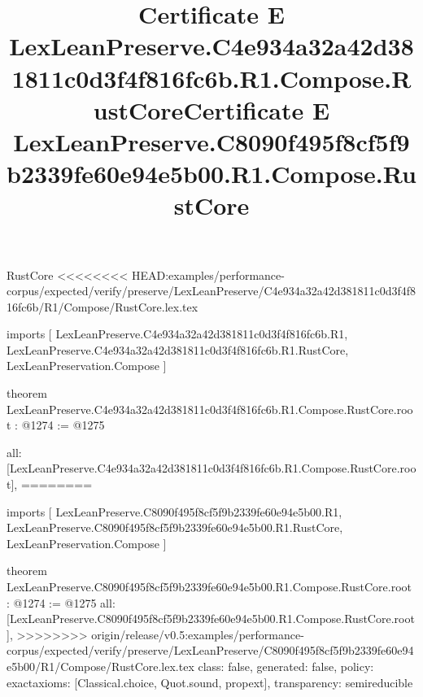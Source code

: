 \begin{lexlean}{RustCore}
<<<<<<<< HEAD:examples/performance-corpus/expected/verify/preserve/LexLeanPreserve/C4e934a32a42d381811c0d3f4f816fc6b/R1/Compose/RustCore.lex.tex
\title{Certificate E LexLeanPreserve.C4e934a32a42d381811c0d3f4f816fc6b.R1.Compose.RustCore}
\begin{coremodule}
imports [
  LexLeanPreserve.C4e934a32a42d381811c0d3f4f816fc6b.R1,
  LexLeanPreserve.C4e934a32a42d381811c0d3f4f816fc6b.R1.RustCore,
  LexLeanPreservation.Compose
]

theorem LexLeanPreserve.C4e934a32a42d381811c0d3f4f816fc6b.R1.Compose.RustCore.root : @1274 := @1275 {
  all: [LexLeanPreserve.C4e934a32a42d381811c0d3f4f816fc6b.R1.Compose.RustCore.root],
========
\title{Certificate E LexLeanPreserve.C8090f495f8cf5f9b2339fe60e94e5b00.R1.Compose.RustCore}
\begin{coremodule}
imports [
  LexLeanPreserve.C8090f495f8cf5f9b2339fe60e94e5b00.R1,
  LexLeanPreserve.C8090f495f8cf5f9b2339fe60e94e5b00.R1.RustCore,
  LexLeanPreservation.Compose
]

theorem LexLeanPreserve.C8090f495f8cf5f9b2339fe60e94e5b00.R1.Compose.RustCore.root : @1274 := @1275 {
  all: [LexLeanPreserve.C8090f495f8cf5f9b2339fe60e94e5b00.R1.Compose.RustCore.root],
>>>>>>>> origin/release/v0.5:examples/performance-corpus/expected/verify/preserve/LexLeanPreserve/C8090f495f8cf5f9b2339fe60e94e5b00/R1/Compose/RustCore.lex.tex
  class: false,
  generated: false,
  policy: exact{axioms: [Classical.choice, Quot.sound, propext]},
  transparency: semireducible
}


\end{coremodule}}
\end{coremodule}
\end{lexlean}
